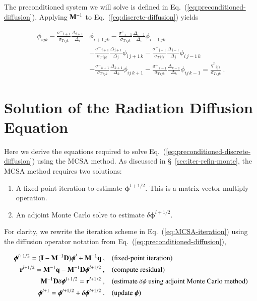 \documentclass[preprint,12pt]{elsarticle}
\newcommand{\vr}{\ensuremath{\ve{r}}}
\newcommand{\vI}{\ensuremath{\ve{I}}}
\newcommand{\qn}{\ensuremath{q^n}} \newcommand{\Tn}{\ensuremath{T^n}}
\newcommand{\Di}{\ensuremath{\Delta_i}}
\newcommand{\Dj}{\ensuremath{\Delta_j}}
\newcommand{\Dk}{\ensuremath{\Delta_k}}
\newcommand{\sigT}{\ensuremath{\sigma_{T\,ijk}}}
\newcommand{\sigm}{\ensuremath{\sigma^{-}}}
\newcommand{\sigp}{\ensuremath{\sigma^{+}}}
\newcommand{\bphi}{\ensuremath{\boldsymbol{\phi}}}
\begin{document}
The preconditioned system we will solve is defined in
Eq.~(\ref{eq:preconditioned-diffusion}).  Applying $\mathbf{M}^{-1}$ to
Eq.~(\ref{eq:discrete-diffusion}) yields

\begin{equation}
  \begin{aligned}
    \phi_{ijk} -
    \frac{\sigm_{i+1}}{\sigT}\frac{\Delta_{i+1}}{\Di}&\phi_{i+1\,jk} -
    \frac{\sigp_{i-1}}{\sigT}\frac{\Delta_{i-1}}{\Di}\phi_{i-1\,jk}\\ &-
    \frac{\sigm_{j+1}}{\sigT}\frac{\Delta_{j+1}}{\Dj}\phi_{i\,j+1\,k}
    -\frac{\sigp_{j-1}}{\sigT}\frac{\Delta_{j-1}}{\Dj}\phi_{i\,j-1\,k}\\ &-
    \frac{\sigm_{k+1}}{\sigT}\frac{\Delta_{k+1}}{\Dk}\phi_{ij\,k+1} -
    \frac{\sigp_{k-1}}{\sigT}\frac{\Delta_{k-1}}{\Dk}\phi_{ij\,k-1} =
    \frac{\qn_{ijk}}{\sigT}\:.
  \end{aligned}
  \label{eq:preconditioned-discrete-diffusion}
\end{equation}

\section{Solution of the Radiation Diffusion Equation}
\label{sec:solut-radi-diff}

Here we derive the equations required to solve
Eq.~(\ref{eq:preconditioned-discrete-diffusion}) using the MCSA
method.  As discussed in \S~\ref{sec:iter-refin-monte}, the MCSA
method requires two solutions:

\begin{enumerate}
\item A fixed-point iteration to estimate $\bphi^{l+1/2}$.  This is a
  matrix-vector multiply operation.
\item An adjoint Monte Carlo solve to estimate $\delta\bphi^{l+1/2}$.
\end{enumerate}

For clarity, we rewrite the iteration scheme in
Eq.~(\ref{eq:MCSA-iteration}) using the diffusion operator notation
from Eq.~(\ref{eq:preconditioned-diffusion}),

\begin{align*}
   \bphi^{l+1/2} = (\vI - \ve{M}^{-1}\ve{D})\bphi^{l} +
  \ve{M}^{-1}\ve{q}\:, \quad & (\text{fixed-point iteration})\\ 
  \vr^{l+1/2} = \ve{M}^{-1}\ve{q} - \ve{M}^{-1}\ve{D}\bphi^{l+1/2}\:,
  \quad & (\text{compute residual})\\ 
  \ve{M}^{-1}\ve{D}\delta\bphi^{l+1/2} = \vr^{l+1/2}\:, \quad&
  (\text{estimate $\delta\phi$ using adjoint Monte Carlo method})\\ 
  \bphi^{l+1} = \bphi^{l+1/2} + \delta\bphi^{l+1/2}\:. \quad&
  (\text{update}\ \bphi)
\end{align*}
\end{document}
